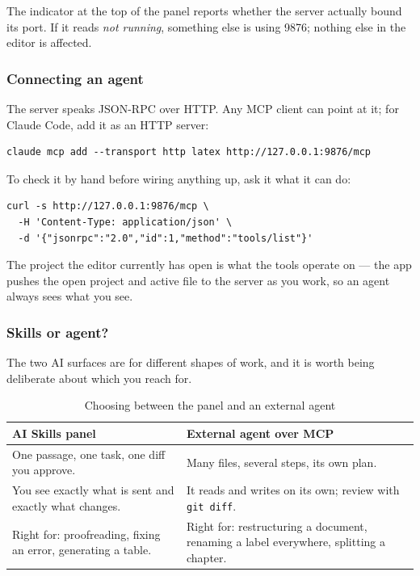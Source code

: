 The indicator at the top of the  panel reports whether the server
actually bound its port. If it reads \emph{not running}, something else is
using 9876; nothing else in the editor is affected.

\subsubsection*{Connecting an agent}

The server speaks JSON-RPC over HTTP. Any MCP client can point at it; for
Claude Code, add it as an HTTP server:

\begin{lstlisting}
claude mcp add --transport http latex http://127.0.0.1:9876/mcp
\end{lstlisting}

To check it by hand before wiring anything up, ask it what it can do:

\begin{lstlisting}
curl -s http://127.0.0.1:9876/mcp \
  -H 'Content-Type: application/json' \
  -d '{"jsonrpc":"2.0","id":1,"method":"tools/list"}'
\end{lstlisting}

The project the editor currently has open is what the tools operate on --- the
app pushes the open project and active file to the server as you work, so an
agent always sees what you see.

\subsubsection*{Skills or agent?}

The two AI surfaces are for different shapes of work, and it is worth being
deliberate about which you reach for.

\begin{table}[htbp]
  \centering
  \caption{Choosing between the panel and an external agent}
  \label{tab:ai-surfaces}
  \begin{tabular}{p{0.44\textwidth}p{0.44\textwidth}}
    \toprule
    \textbf{AI Skills panel} & \textbf{External agent over MCP} \\
    \midrule
    One passage, one task, one diff you approve.
      & Many files, several steps, its own plan. \\[3pt]
    You see exactly what is sent and exactly what changes.
      & It reads and writes on its own; review with \texttt{git diff}. \\[3pt]
    Right for: proofreading, fixing an error, generating a table.
      & Right for: restructuring a document, renaming a label everywhere,
        splitting a chapter. \\
    \bottomrule
  \end{tabular}
\end{table}


